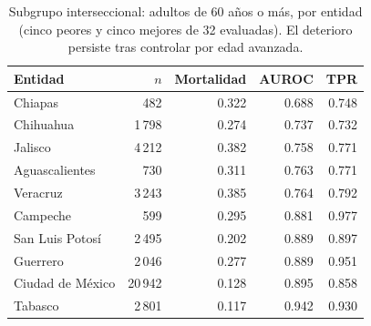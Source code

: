 
\begin{table}[htbp]
\centering
\caption{Subgrupo interseccional: adultos de 60 años o más, por entidad
(cinco peores y cinco mejores de 32 evaluadas). El deterioro persiste
tras controlar por edad avanzada.}
\label{tab:interseccional}
\begin{tabular}{l r r r r}
\toprule
Entidad & $n$ & Mortalidad & AUROC & TPR \\
\midrule
Chiapas & 482 & 0.322 & 0.688 & 0.748 \\
Chihuahua & 1\,798 & 0.274 & 0.737 & 0.732 \\
Jalisco & 4\,212 & 0.382 & 0.758 & 0.771 \\
Aguascalientes & 730 & 0.311 & 0.763 & 0.771 \\
Veracruz & 3\,243 & 0.385 & 0.764 & 0.792 \\
\midrule
Campeche & 599 & 0.295 & 0.881 & 0.977 \\
San Luis Potosí & 2\,495 & 0.202 & 0.889 & 0.897 \\
Guerrero & 2\,046 & 0.277 & 0.889 & 0.951 \\
Ciudad de México & 20\,942 & 0.128 & 0.895 & 0.858 \\
Tabasco & 2\,801 & 0.117 & 0.942 & 0.930 \\
\bottomrule
\end{tabular}
\end{table}

